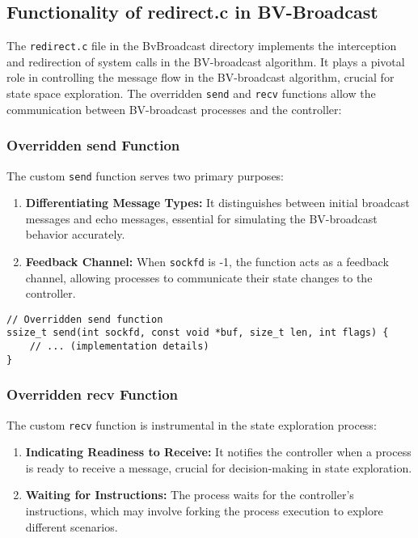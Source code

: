 \documentclass[a4paper,11pt,oneside]{report}
\begin{document}
\subsection{Functionality of redirect.c in BV-Broadcast}
The \texttt{redirect.c} file in the BvBroadcast directory implements the interception and redirection of system calls in the BV-broadcast algorithm.
It plays a pivotal role in controlling the message flow in the BV-broadcast algorithm, crucial for state space exploration.
The overridden \texttt{send} and \texttt{recv} functions allow the communication between BV-broadcast processes and the controller:

\subsubsection{Overridden send Function}
The custom \texttt{send} function serves two primary purposes:
\begin{enumerate}
    \item \textbf{Differentiating Message Types:} It distinguishes between initial broadcast messages and echo messages, essential for simulating the BV-broadcast behavior accurately.
    \item \textbf{Feedback Channel:} When \texttt{sockfd} is -1, the function acts as a feedback channel, allowing processes to communicate their state changes to the controller.
\end{enumerate}

\begin{verbatim}
// Overridden send function
ssize_t send(int sockfd, const void *buf, size_t len, int flags) {
    // ... (implementation details)
}
\end{verbatim}

\subsubsection{Overridden recv Function}
The custom \texttt{recv} function is instrumental in the state exploration process:
\begin{enumerate}
    \item \textbf{Indicating Readiness to Receive:} It notifies the controller when a process is ready to receive a message, crucial for decision-making in state exploration.
    \item \textbf{Waiting for Instructions:} The process waits for the controller's instructions, which may involve forking the process execution to explore different scenarios.
\end{enumerate}
\end{document}
